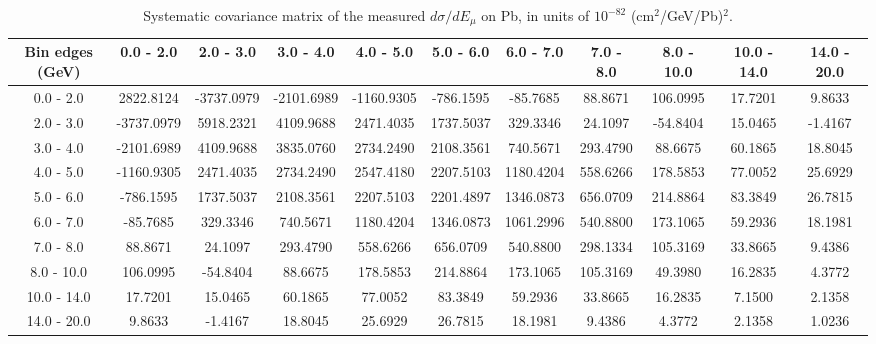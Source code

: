 \documentclass[aps,prl,twocolumn,superscriptaddress,nofootinbib]{revtex4-1}
\begin{document}
\begin{turnpage}
 \begin{table}[h!]
  \centering
  \caption{Systematic covariance matrix of the measured $d\sigma/dE_{\mu}$ on Pb, in units of $10^{-82}$ (cm$^{2}$/GeV/Pb)$^{2}$.}
    \begin{tabular}{c||cccccccccc}
      Bin edges (GeV) & 0.0 - 2.0 & 2.0 - 3.0 & 3.0 - 4.0 & 4.0 - 5.0 & 5.0 - 6.0 & 6.0 - 7.0 & 7.0 - 8.0 & 8.0 - 10.0 & 10.0 - 14.0 & 14.0 - 20.0 \\
\hline \hline
        0.0 - 2.0 & 2822.8124 & -3737.0979 & -2101.6989 & -1160.9305 & -786.1595 & -85.7685 & 88.8671 & 106.0995 & 17.7201 &  9.8633 \\
        2.0 - 3.0 & -3737.0979 & 5918.2321 & 4109.9688 & 2471.4035 & 1737.5037 & 329.3346 & 24.1097 & -54.8404 & 15.0465 & -1.4167 \\
        3.0 - 4.0 & -2101.6989 & 4109.9688 & 3835.0760 & 2734.2490 & 2108.3561 & 740.5671 & 293.4790 & 88.6675 & 60.1865 & 18.8045 \\
        4.0 - 5.0 & -1160.9305 & 2471.4035 & 2734.2490 & 2547.4180 & 2207.5103 & 1180.4204 & 558.6266 & 178.5853 & 77.0052 & 25.6929 \\
        5.0 - 6.0 & -786.1595 & 1737.5037 & 2108.3561 & 2207.5103 & 2201.4897 & 1346.0873 & 656.0709 & 214.8864 & 83.3849 & 26.7815 \\
        6.0 - 7.0 & -85.7685 & 329.3346 & 740.5671 & 1180.4204 & 1346.0873 & 1061.2996 & 540.8800 & 173.1065 & 59.2936 & 18.1981 \\
        7.0 - 8.0 & 88.8671 & 24.1097 & 293.4790 & 558.6266 & 656.0709 & 540.8800 & 298.1334 & 105.3169 & 33.8665 &  9.4386 \\
       8.0 - 10.0 & 106.0995 & -54.8404 & 88.6675 & 178.5853 & 214.8864 & 173.1065 & 105.3169 & 49.3980 & 16.2835 &  4.3772 \\
      10.0 - 14.0 & 17.7201 & 15.0465 & 60.1865 & 77.0052 & 83.3849 & 59.2936 & 33.8665 & 16.2835 &  7.1500 &  2.1358 \\
      14.0 - 20.0 &  9.8633 & -1.4167 & 18.8045 & 25.6929 & 26.7815 & 18.1981 &  9.4386 &  4.3772 &  2.1358 &  1.0236 \\
    \end{tabular}
  \label{tablecov:Pb_Systematic_Emu}
  \end{table}
\end{turnpage}
\end{document}
